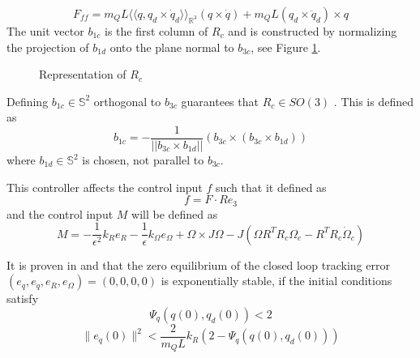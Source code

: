 \begin{equation}\label{key}
F_{ff}=m_QL\langle\!\langle q,q_d\times\dot{q}_d\rangle\!\rangle_{\mathbb{R}^3}(q\times \dot{q})+m_QL(q_d\times \ddot{q}_d)\times q
\end{equation}
The unit vector $ b_{1c} $ is the first column of $ R_c $ and is constructed by normalizing the projection of $ b_{1d} $ onto the plane normal to $ b_{3c} $, see Figure \ref{fig:con.b1c}. 
\begin{figure}[h!]
	\centering
	\caption{Representation of $ R_c $\label{fig:con.b1c}}
\end{figure}	

Defining $ b_{1c}\in\mathbb{S}^2$ orthogonal to  $ b_{3c}$ guarantees that $ R_c \in SO(3) $ \cite{Lee2010c}.
This is defined as 
\begin{equation}\label{key}
b_{1c}=-\frac{1}{||b_{3c}\times b_{1d}||}(b_{3c}\times(b_{3c}\times b_{1d}))
\end{equation}
where $ b_{1d}\in \mathbb{S}^2 $ is chosen, not parallel to $ b_{3c} $. 
	
This controller affects the control input $ f $ such that it defined as
\begin{equation}\label{eq:con.fLoadatt}
f=F\cdot Re_3
\end{equation}
and the control input $ M $ will be defined as
\begin{equation}\label{eq:con.MLoadatt}
M = -\frac{1}{\epsilon^2}k_Re_R-\frac{1}{\epsilon}k_\Omega e_\Omega+\Omega\times J\Omega-J(\hat{\Omega}R^TR_c\Omega_c-R^TR_c\dot{\Omega}_c)
\end{equation} 

It is proven in \cite{Sreenath2013c} and \cite[Lemma 11.23]{Bullo2005} that the zero equilibrium of the closed loop tracking error $ (e_q,e_{\dot{q}},e_R,e_\Omega)=(0,0,0,0) $ is exponentially stable, if the initial conditions satisfy
\begin{equation}\label{eq:dom3}
\Psi_q(q(0),q_d(0))<2
\end{equation}
\begin{equation}\label{eq:dom4}
\parallel e_{\dot{q}}(0)\parallel^2<\frac{2}{m_QL}{k_R}(2-\Psi_q(q(0),q_d(0)))
\end{equation}


